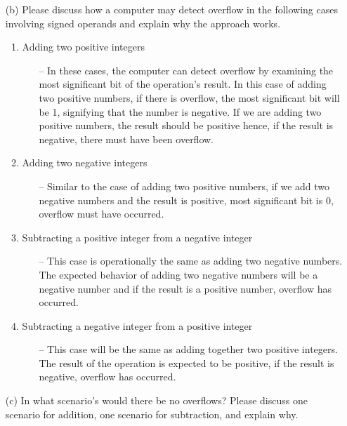 \documentclass[12pt]{article}
\begin{document}
    \begin{itemize}
        \item[(b)] Please discuss how a computer may detect overflow in the following cases involving signed operands and explain why the approach works.
            \begin{enumerate}
                \item Adding two positive integers
                    \begin{itemize}
                        \item[--] In these cases, the computer can detect overflow by examining the most significant bit of the operation's result. In this case of adding two positive numbers, if there is overflow, the most significant bit will be 1, signifying that the number is negative. If we are adding two positive numbers, the result should be positive hence, if the result is negative, there must have been overflow.
                    \end{itemize}
                \item Adding two negative integers
                    \begin{itemize}
                        \item[--] Similar to the case of adding two positive numbers, if we add two negative numbers and the result is positive, most significant bit is 0, overflow must have occurred.
                    \end{itemize}
                \item Subtracting a positive integer from a negative integer
                    \begin{itemize}
                        \item[--] This case is operationally the same as adding two negative numbers. The expected behavior of adding two negative numbers will be a negative number and if the result is a positive number, overflow has occurred.
                    \end{itemize}
                \item Subtracting a negative integer from a positive integer
                    \begin{itemize}
                        \item[--] This case will be the same as adding together two positive integers. The result of the operation is expected to be positive, if the result is negative, overflow has occurred.
                    \end{itemize}
            \end{enumerate}
        \item[(c)] In what scenario's would there be no overflows? Please discuss one scenario for addition, one scenario for subtraction, and explain why.
    \end{itemize}
\end{document}

